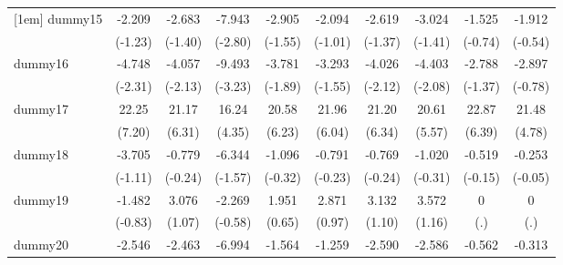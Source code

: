 {\begin{tabular}{l*{9}{c}}
[1em]
dummy15     &      -2.209         &      -2.683         &      -7.943\sym{**} &      -2.905         &      -2.094         &      -2.619         &      -3.024         &      -1.525         &      -1.912         \\
            &     (-1.23)         &     (-1.40)         &     (-2.80)         &     (-1.55)         &     (-1.01)         &     (-1.37)         &     (-1.41)         &     (-0.74)         &     (-0.54)         \\
[1em]
dummy16     &      -4.748\sym{*}  &      -4.057\sym{*}  &      -9.493\sym{**} &      -3.781         &      -3.293         &      -4.026\sym{*}  &      -4.403\sym{*}  &      -2.788         &      -2.897         \\
            &     (-2.31)         &     (-2.13)         &     (-3.23)         &     (-1.89)         &     (-1.55)         &     (-2.12)         &     (-2.08)         &     (-1.37)         &     (-0.78)         \\
[1em]
dummy17     &       22.25\sym{***}&       21.17\sym{***}&       16.24\sym{***}&       20.58\sym{***}&       21.96\sym{***}&       21.20\sym{***}&       20.61\sym{***}&       22.87\sym{***}&       21.48\sym{***}\\
            &      (7.20)         &      (6.31)         &      (4.35)         &      (6.23)         &      (6.04)         &      (6.34)         &      (5.57)         &      (6.39)         &      (4.78)         \\
[1em]
dummy18     &      -3.705         &      -0.779         &      -6.344         &      -1.096         &      -0.791         &      -0.769         &      -1.020         &      -0.519         &      -0.253         \\
            &     (-1.11)         &     (-0.24)         &     (-1.57)         &     (-0.32)         &     (-0.23)         &     (-0.24)         &     (-0.31)         &     (-0.15)         &     (-0.05)         \\
[1em]
dummy19     &      -1.482         &       3.076         &      -2.269         &       1.951         &       2.871         &       3.132         &       3.572         &           0         &           0         \\
            &     (-0.83)         &      (1.07)         &     (-0.58)         &      (0.65)         &      (0.97)         &      (1.10)         &      (1.16)         &         (.)         &         (.)         \\
[1em]
dummy20     &      -2.546\sym{*}  &      -2.463         &      -6.994\sym{**} &      -1.564         &      -1.259         &      -2.590         &      -2.586         &      -0.562         &      -0.313         \\

\end{tabular}}
